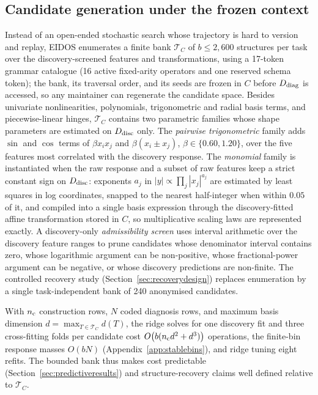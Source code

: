 \subsection{Candidate generation under the frozen context}\label{sec:candidates}

Instead of an open-ended stochastic search whose trajectory is hard to version and replay, EIDOS enumerates a finite bank \(\mathcal T_C\) of \(b\le2{,}600\) structures per task over the discovery-screened features and transformations, using a 17-token grammar catalogue (16 active fixed-arity operators and one reserved schema token); the bank, its traversal order, and its seeds are frozen in \(C\) before \(D_{\rm diag}\) is accessed, so any maintainer can regenerate the candidate space. Besides univariate nonlinearities, polynomials, trigonometric and radial basis terms, and piecewise-linear hinges, \(\mathcal T_C\) contains two parametric families whose shape parameters are estimated on \(D_{\rm disc}\) only. The \emph{pairwise trigonometric} family adds \(\sin\) and \(\cos\) terms of \(\beta x_ix_j\) and \(\beta(x_i\pm x_j)\), \(\beta\in\{0.60,1.20\}\), over the five features most correlated with the discovery response. The \emph{monomial} family is instantiated when the raw response and a subset of raw features keep a strict constant sign on \(D_{\rm disc}\): exponents \(a_j\) in \(|y|\propto\prod_j|x_j|^{a_j}\) are estimated by least squares in log coordinates, snapped to the nearest half-integer when within \(0.05\) of it, and compiled into a single basis expression through the discovery-fitted affine transformation stored in \(C\), so multiplicative scaling laws are represented exactly. A discovery-only \emph{admissibility screen} uses interval arithmetic over the discovery feature ranges to prune candidates whose denominator interval contains zero, whose logarithmic argument can be non-positive, whose fractional-power argument can be negative, or whose discovery predictions are non-finite. The controlled recovery study (Section~\ref{sec:recoverydesign}) replaces enumeration by a single task-independent bank of 240 anonymised candidates.

With \(n_{\rm c}\) construction rows, \(N\) coded diagnosis rows, and maximum basis dimension \(d=\max_{T\in\mathcal T_C}d(T)\), the ridge solves for one discovery fit and three cross-fitting folds per candidate cost \(O\big(b(n_{\rm c}d^{2}+d^{3})\big)\) operations, the finite-bin response masses \(O(bN)\) (Appendix~\ref{app:stablebins}), and ridge tuning eight refits. The bounded bank thus makes cost predictable (Section~\ref{sec:predictiveresults}) and structure-recovery claims well defined relative to \(\mathcal T_C\).

